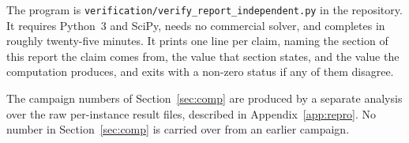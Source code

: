 The program is \texttt{verification/verify\_report\_independent.py} in the repository.
It requires Python~3 and SciPy, needs no commercial solver, and completes in roughly
twenty-five minutes. It prints one line per claim, naming the section of this report the
claim comes from, the value that section states, and the value the computation
produces, and exits with a non-zero status if any of them disagree.

The campaign numbers of Section~\ref{sec:comp} are produced by a separate analysis over
the raw per-instance result files, described in Appendix~\ref{app:repro}. No number in
Section~\ref{sec:comp} is carried over from an earlier campaign.

